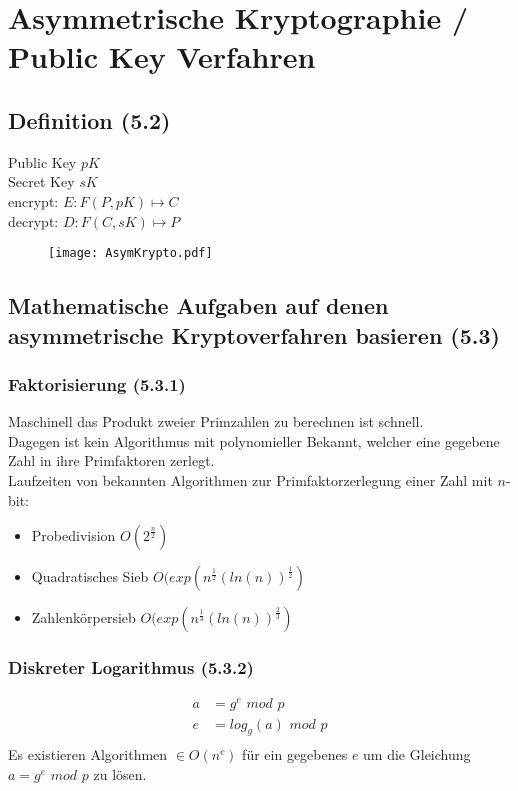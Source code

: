 \chapter{Asymmetrische Kryptographie / Public Key Verfahren}
\section{Definition (5.2)}
Public Key $pK$ \\
Secret Key $sK$ \\
encrypt: $E: F(P, pK) \mapsto C $ \\
decrypt: $D: F(C, sK) \mapsto P $ \\

\begin{figure}[htp]
	\centering
	\texttt{[image: AsymKrypto.pdf]}
\end{figure}

\section{Mathematische Aufgaben auf denen asymmetrische Kryptoverfahren basieren (5.3)}

\subsection{Faktorisierung (5.3.1)}
Maschinell das Produkt zweier Primzahlen zu berechnen ist schnell. \\
Dagegen ist kein Algorithmus mit polynomieller Bekannt, welcher eine gegebene Zahl in ihre Primfaktoren zerlegt. \\
Laufzeiten von bekannten Algorithmen zur Primfaktorzerlegung einer Zahl mit $n$-bit:
\begin{itemize}
  \item Probedivision $O(2^\frac{n}{2})$
  \item Quadratisches Sieb $O(exp(n^\frac{1}{2}(ln(n))^\frac{1}{2})$
  \item Zahlenkörpersieb $O(exp(n^\frac{1}{3}(ln(n))^\frac{2}{3})$
\end{itemize}

\subsection{Diskreter Logarithmus (5.3.2)}
\begin{align*}
a &= g^e \hspace{4pt} mod \hspace{4pt} p \\
e &= log_g(a) \hspace{4pt} mod \hspace{4pt} p \\
\end{align*}
Es existieren Algorithmen $\in O(n^c)$ für ein gegebenes $e$ um die Gleichung $a = g^e \hspace{4pt} mod \hspace{4pt} p$ zu lösen.

